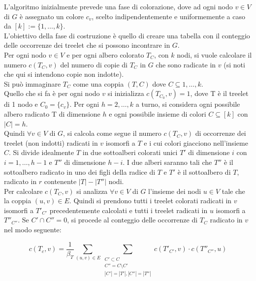 L'algoritmo inizialmente prevede una fase di colorazione, dove ad ogni nodo $ v \in V $ di $ G $ \`e assegnato un colore $ c_v $, scelto indipendentemente e uniformemente a caso da $ [k] := \{1, \dots ,k\} $.\\
L'obiettivo della fase di costruzione \`e quello di creare una tabella con il conteggio delle occorrenze dei treelet che si possono incontrare in $ G $.\\
Per ogni nodo $ v \in V $ e per ogni albero colorato $ T_C $, con $ k $ nodi, si vuole calcolare il numero $ c(T_C , v) $ del numero di copie di $ T_C $  in $ G $ che sono radicate in $ v $ (si noti che qui si intendono copie non indotte).\\
Si pu\`o immaginare $ T_C $ come una coppia $ (T,C) $ dove $ C \subseteq {1,\dots,k} $.\\
Quello che si fa \`e per ogni nodo $ v $ si inizializza $ c(T_{C_0} , v) = 1 $, dove T \`e il treelet di 1 nodo e $ C_0 = \{c_v\} $.
Per ogni $ h = 2,\dots,k $ a turno, si considera ogni possibile albero radicato T di dimensione $ h $ e ogni possibile insieme di colori $ C \subseteq [k] $ con $ |C| = h $.\\
Quindi $ \forall v \in V$ di $ G $, si calcola come segue il numero $ c(T_C,v) $ di occorrenze dei treelet (non indotti) radicati in $ v $ isomorfi a $ T $ e i cui colori giacciono nell'insieme $ C $. Si divide idealmente $ T $ in due sottoalberi colorati unici $ T' $ di dimensione $ i $ con $ i = 1, \dots,h-1 $ e $ T'' $ di dimensione $ h-i $.
I due alberi saranno tali che  $ T'' $ \`e il sottoalbero radicato in uno dei figli della radice di $ T $ e $ T' $ \`e il sottoalbero di $ T $, radicato in $ r $ contenente $ |T| - |T''| $ nodi.\\
Per calcolare $ c(T_C,v) $ si analizza $ \forall v \in V $ di $ G $ l'insieme dei nodi $ u \in V $ tale che la coppia $ (u,v)\in E $.
Quindi si prendono  tutti i treelet colorati radicati in $ v $ isomorfi a $ T'_{C'} $ precedentemente calcolati e tutti i  treelet radicati in $ u $ isomorfi a $ T''_{C''} $.
Se $ C' \cap C'' = 0 $, si procede al conteggio delle occorrenze di $ T_C $ radicato in $ v $ nel modo seguente:

\begin{equation}\label{conta}
	c(T_c,v)=\frac{1}{\beta_T}\sum_{(u,v)\in E}\sum_{\substack{C' \subset C \\C'' = C \setminus C' \\ |C'|=|T'|, |C''| = |T''|}}c(T'_{C'},v)\cdot c(T''_{C''},u)
\end{equation}

